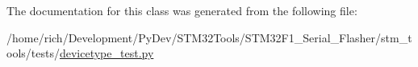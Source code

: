 The documentation for this class was generated from the following file\+:\begin{DoxyCompactItemize}
\item 
/home/rich/\+Development/\+Py\+Dev/\+S\+T\+M32\+Tools/\+S\+T\+M32\+F1\+\_\+\+Serial\+\_\+\+Flasher/stm\+\_\+tools/tests/\hyperlink{devicetype__test_8py}{devicetype\+\_\+test.\+py}\end{DoxyCompactItemize}
